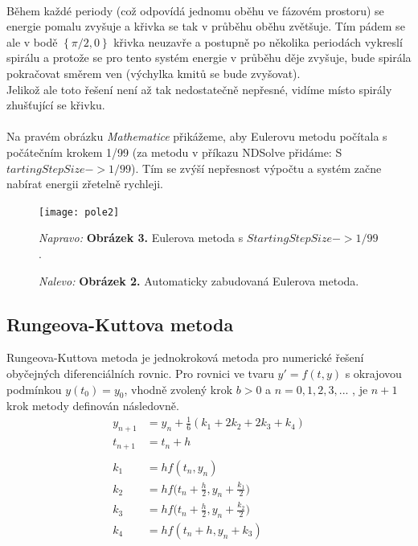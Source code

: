 \documentclass[reqno, a4paper]{amsart}
\begin{document}
				\\
				Během každé periody (což odpovídá jednomu oběhu ve fázovém prostoru) se energie pomalu zvyšuje a křivka se tak v průběhu oběhu zvětšuje. Tím pádem se ale v bodě $\left\lbrace \pi/2,0\right\rbrace $ křivka neuzavře a postupně po několika periodách vykreslí spirálu a protože se pro tento systém energie v průběhu děje zvyšuje, bude spirála pokračovat směrem ven (výchylka kmitů se bude zvyšovat). 
				\\
				Jelikož ale toto řešení není až tak nedostatečně nepřesné, vidíme místo spirály zhušťující se křivku.
				\\
				\\
				Na pravém obrázku \textit{Mathematice} přikážeme, aby Eulerovu metodu počítala s počátečním krokem 1/99 (za metodu v příkazu NDSolve přidáme: S$ tartingStepSize -> 1/99 $). Tím se zvýší nepřesnost výpočtu a systém začne nabírat energii zřetelně rychleji.
				\begin{figure}[h]
					\centering
					\texttt{[image: pole2]}
					\caption*{\textit{Nalevo:} \textbf{Obrázek 2.} Automaticky zabudovaná Eulerova metoda.}  \textit{Napravo:} \textbf{Obrázek 3.} Eulerova metoda s $StartingStepSize -> 1/99$.
				\end{figure}
				\clearpage
				\subsection{Rungeova-Kuttova metoda}
				\label{sec:Rungeova-Kuttova metoda}
				Rungeova-Kuttova metoda je jednokroková metoda pro numerické řešení obyčejných diferenciálních rovnic. Pro rovnici ve tvaru \( y'= f(t,y)\) s okrajovou podmínkou \(y(t_0)=y_0 \), vhodně zvolený krok \(b>0\) a \(n = 0, 1, 2, 3, ...\) , je $n+1$ krok metody definován následovně.
				\begin{align*}
					y_{n+1} &= y_n + \frac{1}{6} (k_1 + 2k_2 +2k_3 +k_4) \\
					t_{n+1} &= t_n +h \\ \\
					k_1 &= h f(t_n,y_n) \\
					k_2 &= h f\Big(t_n + \frac{h}{2},y_n + \frac{k_1}{2}\Big) \\
					k_3 &= h f\Big(t_n + \frac{h}{2},y_n + \frac{k_2}{2}\Big) \\
					k_4 &= h f(t_n + h ,y_n + k_3) 
				\end{align*}
\end{document}
